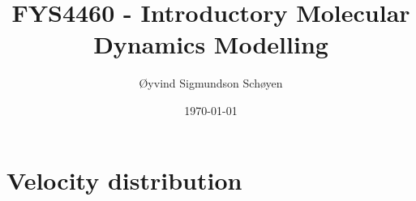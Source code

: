\documentclass[12pt, a4paper]{article}
\newcommand{\1}{\mathds{1}}
\begin{document}
\title{FYS4460 - Introductory Molecular Dynamics Modelling}
\author{Øyvind Sigmundson Schøyen}
\date{\today}

\maketitle

\section{Velocity distribution}



\end{document}
